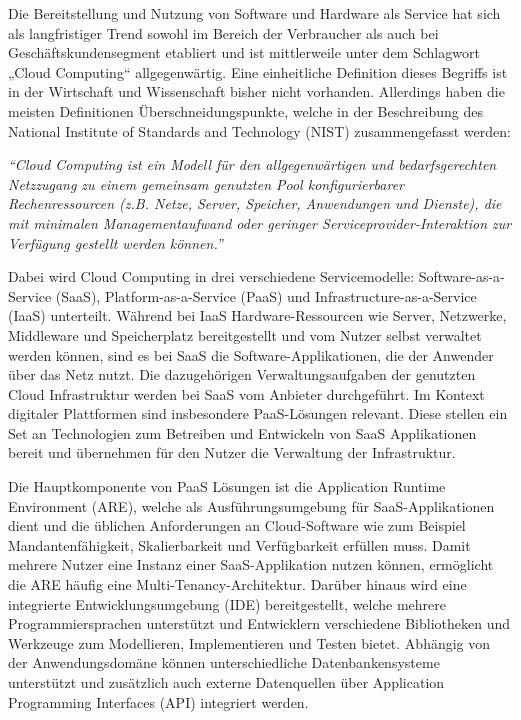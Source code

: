 Die Bereitstellung und Nutzung von Software und Hardware als Service hat sich als langfristiger Trend sowohl im Bereich der Verbraucher als auch bei Geschäftskundensegment etabliert und ist mittlerweile unter dem Schlagwort „Cloud Computing“ allgegenwärtig. Eine einheitliche Definition dieses Begriffs ist in der Wirtschaft und Wissenschaft bisher nicht vorhanden. Allerdings haben die meisten Definitionen Überschneidungspunkte, welche in der Beschreibung des National Institute of Standards and Technology (NIST) zusammengefasst werden: 

\begin{center}
    \textit{\enquote{Cloud Computing ist ein Modell für den allgegenwärtigen und bedarfsgerechten Netzzugang zu einem gemeinsam genutzten Pool konfigurierbarer Rechenressourcen (z.B. Netze, Server, Speicher, Anwendungen und Dienste), die mit minimalen Managementaufwand oder geringer Serviceprovider-Interaktion zur Verfügung gestellt werden können.}} \autocite[S. 2]{MELL2011}
\end{center}

Dabei wird Cloud Computing in drei verschiedene Servicemodelle: Software-as-a-Service (SaaS), Platform-as-a-Service (PaaS) und Infrastructure-as-a-Service (IaaS) unterteilt. Während bei IaaS Hardware-Ressourcen wie Server, Netzwerke, Middleware und Speicherplatz bereitgestellt und vom Nutzer selbst verwaltet werden können, sind es bei SaaS die Software-Applikationen, die der Anwender über das Netz nutzt. Die dazugehörigen Verwaltungsaufgaben der genutzten Cloud Infrastruktur werden bei SaaS vom Anbieter durchgeführt. Im Kontext digitaler Plattformen sind insbesondere PaaS-Lösungen relevant.\autocite[Vgl.][S. 2f]{MELL2011} Diese stellen ein Set an Technologien zum Betreiben und Entwickeln von SaaS Applikationen bereit und übernehmen für den Nutzer die Verwaltung der Infrastruktur.\autocite[Vgl.][S. 8]{BRAUNINGER2012}

Die Hauptkomponente von PaaS Lösungen ist die Application Runtime Environment (ARE), welche als Ausführungsumgebung für SaaS-Applikationen dient und die üblichen Anforderungen an Cloud-Software wie zum Beispiel Mandantenfähigkeit, Skalierbarkeit und Verfügbarkeit erfüllen muss. Damit mehrere Nutzer eine Instanz einer SaaS-Applikation nutzen können, ermöglicht die ARE häufig eine Multi-Tenancy-Architektur. Darüber hinaus wird eine integrierte Entwicklungsumgebung (IDE) bereitgestellt, welche mehrere Programmiersprachen unterstützt und Entwicklern verschiedene Bibliotheken und Werkzeuge zum Modellieren, Implementieren und Testen bietet. Abhängig von der Anwendungsdomäne können unterschiedliche Datenbankensysteme unterstützt und zusätzlich auch externe Datenquellen über Application Programming Interfaces (API) integriert werden. \autocite[Vgl.][S. 371]{BEIMBORN2011}

